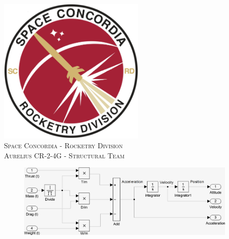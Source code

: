 \documentclass[]{article}
\date{}
\begin{document}
%
%
\begin{titlepage}

\newcommand{\HRule}{\rule{\linewidth}{0.5mm}} %

\center %
 

\includegraphics[width=200pt,height=200pt]{../images/rocketry_logo_large.png}\\[1cm] %
\textsc{\Large Space Concordia - Rocketry Division}\\[0.5cm] %
\textsc{\large Aurelius CR-2-4G - Structural Team}\\[0.5cm] %


\begin{figure}[ht]
    \centering
    \includegraphics[height=100pt]{../images/vertical_model_simplified.png}\\
\end{figure}


\end{titlepage}
\end{document}
